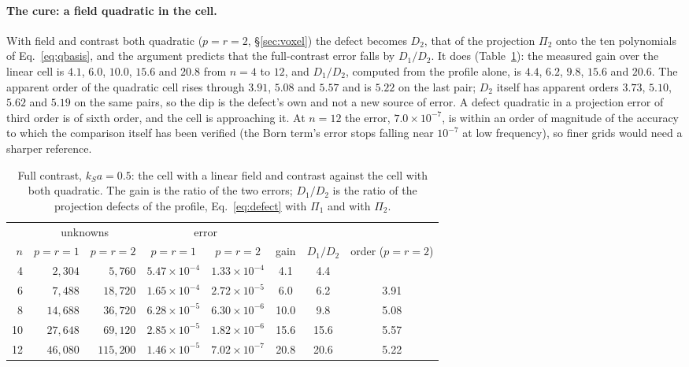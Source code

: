 \documentclass[11pt,a4paper]{article}
\begin{document}
\paragraph{The cure: a field quadratic in the cell.} With field and contrast both quadratic ($p=r=2$,
\S\ref{sec:voxel}) the defect becomes $D_2$, that of the projection $\Pi_2$ onto the ten polynomials of
Eq.~\eqref{eq:qbasis}, and the argument predicts that the full-contrast error falls by $D_1/D_2$. It does
(Table~\ref{tab:quadratic}): the measured gain over the linear cell is $4.1$, $6.0$, $10.0$, $15.6$ and
$20.8$ from $n=4$ to $12$, and $D_1/D_2$, computed from the profile alone, is $4.4$, $6.2$, $9.8$, $15.6$
and $20.6$. The apparent order of the quadratic cell rises through $3.91$, $5.08$ and $5.57$ and is
$5.22$ on the last pair; $D_2$ itself has apparent orders $3.73$, $5.10$, $5.62$ and $5.19$ on the same
pairs, so the dip is the defect's own and not a new source of error. A defect quadratic in a projection
error of third order is of sixth order, and the cell is approaching it. At $n=12$ the error, $7.0\times
10^{-7}$, is within an order of magnitude of the accuracy to which the comparison itself has been
verified (the Born term's error stops falling near $10^{-7}$ at low frequency), so finer grids would need
a sharper reference.

\begin{table}[ht]
\centering\small
\setlength{\tabcolsep}{6pt}
\begin{tabular}{@{}rrrccccc@{}}
\toprule
 & \multicolumn{2}{c}{unknowns} & \multicolumn{2}{c}{error} & & & \\
\cmidrule(lr){2-3}\cmidrule(lr){4-5}
$n$ & $p=r=1$ & $p=r=2$ & $p=r=1$ & $p=r=2$ & gain & $D_1/D_2$ & order ($p=r=2$) \\
\midrule
4 & $2{,}304$ & $5{,}760$ & $5.47\times10^{-4}$ & $1.33\times10^{-4}$ & 4.1 & 4.4 & \\
6 & $7{,}488$ & $18{,}720$ & $1.65\times10^{-4}$ & $2.72\times10^{-5}$ & 6.0 & 6.2 & 3.91 \\
8 & $14{,}688$ & $36{,}720$ & $6.28\times10^{-5}$ & $6.30\times10^{-6}$ & 10.0 & 9.8 & 5.08 \\
10 & $27{,}648$ & $69{,}120$ & $2.85\times10^{-5}$ & $1.82\times10^{-6}$ & 15.6 & 15.6 & 5.57 \\
12 & $46{,}080$ & $115{,}200$ & $1.46\times10^{-5}$ & $7.02\times10^{-7}$ & 20.8 & 20.6 & 5.22 \\
\bottomrule
\end{tabular}
\caption{Full contrast, $k_Sa=0.5$: the cell with a linear field and contrast against the cell with both
quadratic. The gain is the ratio of the two errors; $D_1/D_2$ is the ratio of the projection defects of
the profile, Eq.~\eqref{eq:defect} with $\Pi_1$ and with $\Pi_2$.}\label{tab:quadratic}
\end{table}
\end{document}
